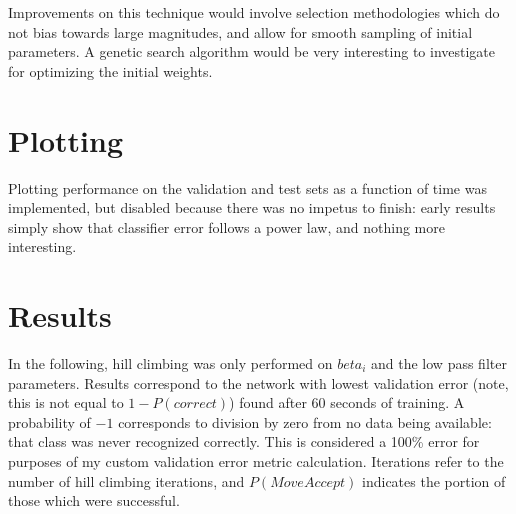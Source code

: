 \documentclass[10pt, conference, compsocconf]{IEEEtran}
\begin{document}
Improvements on this technique would involve selection methodologies which do not bias towards large magnitudes, and allow for smooth sampling of initial parameters. A genetic search algorithm would be very interesting to investigate for optimizing the initial weights.

\section{Plotting}
Plotting performance on the validation and test sets as a function of time was implemented, but disabled because there was no impetus to finish: early results simply show that classifier error follows a power law, and nothing more interesting. 

\section{Results}
In the following, hill climbing was only performed on $beta_i$ and the low pass filter parameters. Results correspond to the network with lowest validation error (note, this is not equal to $1-P(correct)$) found after 60 seconds of training. A probability of $-1$ corresponds to division by zero from no data being available: that class was never recognized correctly. This is considered a 100\% error for purposes of my custom validation error metric calculation. Iterations refer to the number of hill climbing iterations, and $P(Move Accept)$ indicates the portion of those which were successful. 
\end{document}
